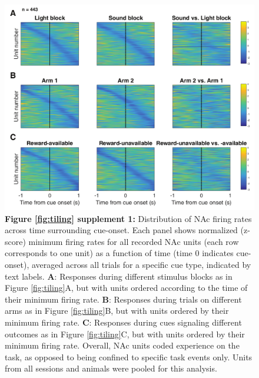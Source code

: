 \documentclass[11pt]{article}
\newcommand{\bsf}[1]{\textbf{#1}}
\begin{document}
 \begin{figure}[ht!]
\centering
\includegraphics[width=\textwidth]{Fig 5 - SUPP Task tiling MIN.pdf}
\caption*{\bsf{Figure \ref{fig:tiling} supplement 1:} Distribution of NAc firing rates across time surrounding cue-onset. Each panel shows normalized (z-score) minimum firing rates for all recorded NAc
units (each row corresponds to one unit) as a function of time (time 0
indicates cue-onset), averaged across all trials for a specific cue type,
indicated by text labels. \bsf{A}: Responses during
different stimulus blocks as in Figure \ref{fig:tiling}A, but with units ordered according to the
time of their minimum firing rate. \bsf{B}: Responses during trials on
different arms as in Figure \ref{fig:tiling}B, but with units ordered by their minimum firing
rate. \bsf{C}: Responses during cues signaling different outcomes as in Figure \ref{fig:tiling}C,
but with units ordered by their minimum firing rate. Overall, NAc units
coded experience on the task, as opposed to being confined to specific task
events only. Units from all sessions and animals were pooled for this
analysis.}
\label{fig:tilingSUPP1}
\end{figure} \clearpage
\end{document}
